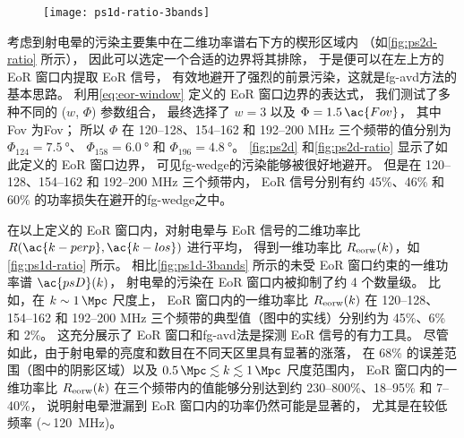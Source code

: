 \begin{figure}[htp]
  \centering
  \texttt{[image: ps1d-ratio-3bands]}
  \label{fig:ps1d-ratio}
\end{figure}

考虑到射电晕的污染主要集中在二维功率谱右下方的楔形区域内
（如\autoref{fig:ps2d-ratio} 所示），
因此可以选定一个合适的边界将其排除，
于是便可以在左上方的 EoR 窗口内提取 EoR 信号，
有效地避开了强烈的前景污染，这就是\ac{fg-avd}方法的基本思路。
利用\autoref{eq:eor-window} 定义的 EoR 窗口边界的表达式，
我们测试了多种不同的 ($w$, $\Phi$) 参数组合，
最终选择了 $w = 3$ 以及 $\Phi = 1.5\,\ac{Fov}$，
其中 \ac{Fov} 为\acl{Fov}；
所以 $\Phi$ 在 \numrange{120}{128}、\numrange{154}{162}
和 \numrange{192}{200} \si{\MHz} 三个频带的值分别为
$\Phi_{124} = \SI{7.5}{\degree}$、
$\Phi_{158} = \SI{6.0}{\degree}$ 和
$\Phi_{196} = \SI{4.8}{\degree}$。
\autoref{fig:ps2d} 和\autoref{fig:ps2d-ratio} 显示了如此定义的 EoR 窗口边界，
可见\ac{fg-wedge}的污染能够被很好地避开。
但是在 \numrange{120}{128}、\numrange{154}{162}
和 \numrange{192}{200} \si{\MHz} 三个频带内，
EoR 信号分别有约 45\%、46\% 和 60\% 的功率损失在避开的\ac{fg-wedge}之中。

在以上定义的 EoR 窗口内，对射电晕与 EoR 信号的二维功率比
$R(\ac{k-perp}, \ac{k-los})$ 进行平均，
得到一维功率比 $R_{\mathrm{eorw}}(k)$，如\autoref{fig:ps1d-ratio} 所示。
相比\autoref{fig:ps1d-3bands} 所示的未受 EoR 窗口约束的一维功率谱 $\ac{psD}(k)$，
射电晕的污染在 EoR 窗口内被抑制了约 4 个数量级。
比如，在 $k \sim \SI{1}{\per\Mpc}$ 尺度上，
EoR 窗口内的一维功率比 $R_{\mathrm{eorw}}(k)$ 在 \numrange{120}{128}、
\numrange{154}{162} 和 \numrange{192}{200} \si{\MHz}
三个频带的典型值（图中的实线）分别约为 45\%、6\% 和 2\%。
这充分展示了 EoR 窗口和\ac{fg-avd}法是探测 EoR 信号的有力工具。
尽管如此，由于射电晕的亮度和数目在不同天区里具有显著的涨落，
在 68\% 的误差范围（图中的阴影区域）以及
$\SI{0.5}{\per\Mpc} \lesssim k \lesssim \SI{1}{\per\Mpc}$ 尺度范围内，
EoR 窗口内的一维功率比 $R_{\mathrm{eorw}}(k)$ 在三个频带内的值能够分别达到约
\numrange{230}{800}\%、\numrange{18}{95}\% 和 \numrange{7}{40}\%，
说明射电晕泄漏到 EoR 窗口内的功率仍然可能是显著的，
尤其是在较低频率 ($\sim$\,\SI{120}{\MHz})。

